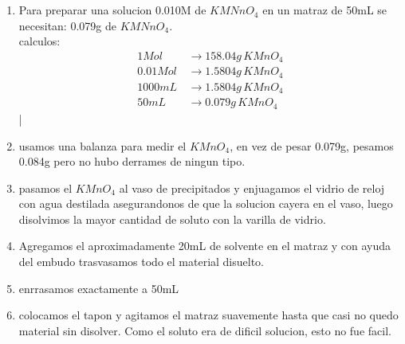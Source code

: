 \documentclass[12pt,a4paper]{report}
\begin{document}
\chapter{}

\begin{enumerate}[label=\alph*]

\item Para preparar una solucion 0.010M de $KMNnO_4$ en un matraz de 50mL se necesitan: 0.079g de $KMNnO_4$.\\
  
  
  calculos:
\begin{equation*}
\begin{aligned}
1 Mol  \, &\rightarrow 158.04g \,KMnO_4\\[6pt]
0.01 Mol  \, &\rightarrow 1.5804g \,KMnO_4\\[6pt]
1000mL \,  &\rightarrow 1.5804g \,KMnO_4  \\[6pt]
50mL\,  &\rightarrow 0.079g \, KMnO_4
\end{aligned}
\end{equation*}
|
\item usamos una balanza para medir el $KMnO_4$, en vez de pesar 0.079g, pesamos 0.084g pero no hubo derrames de ningun tipo.
\item pasamos el $KMnO_4$ al vaso de precipitados y enjuagamos el vidrio de reloj con agua destilada asegurandonos de que la solucion cayera en el vaso, luego disolvimos la mayor cantidad de soluto con la varilla de vidrio.
\item Agregamos el aproximadamente 20mL de solvente en el matraz y con ayuda del embudo trasvasamos todo el material disuelto.
\item enrrasamos exactamente a 50mL
\item colocamos el tapon y agitamos el matraz suavemente hasta que casi no quedo material sin disolver. Como el soluto era de dificil solucion, esto no fue facil.

\end{enumerate}
 
\chapter{}
\end{document}
